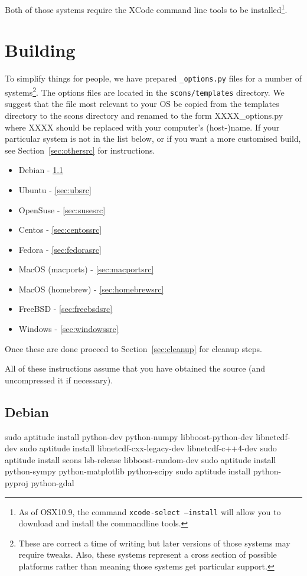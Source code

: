 \noindent Both of those systems require the XCode command line tools to be installed\footnote{As of OSX10.9, the 
command \texttt{xcode-select --install} will allow you to download and install the commandline tools.}.

\section{Building}\label{sec:build}

To simplify things for people, we have prepared \texttt{_options.py} files for a number of 
systems\footnote{These are correct a time of writing but later versions of those systems may require tweaks. 
Also, these systems represent a cross section of possible platforms rather than meaning those systems get particular support.}.
The options files are located in the \texttt{scons/templates} directory. We suggest that the file most relevant to your OS 
be copied from the templates directory to the scons directory and renamed to the form XXXX_options.py where XXXX 
should be replaced with your computer's (host-)name.
If your particular system is not in the list below, or if you want a more customised 
build, 
see Section~\ref{sec:othersrc} for instructions.
\begin{itemize}
 \item Debian - \ref{sec:debsrc}
 \item Ubuntu - \ref{sec:ubsrc}
 \item OpenSuse - \ref{sec:susesrc}
 \item Centos - \ref{sec:centossrc}
 \item Fedora - \ref{sec:fedorasrc}
 \item MacOS (macports) - \ref{sec:macportsrc}
 \item MacOS (homebrew) - \ref{sec:homebrewsrc}
 \item FreeBSD - \ref{sec:freebsdsrc}
 \item Windows - \ref{sec:windowssrc}
\end{itemize}

Once these are done proceed to Section~\ref{sec:cleanup} for cleanup steps.

All of these instructions assume that you have obtained the \escript source (and uncompressed it if necessary).
\subsection{Debian}\label{sec:debsrc}

\begin{shellCode}
sudo aptitude install python-dev python-numpy libboost-python-dev libnetcdf-dev 
sudo aptitude install libnetcdf-cxx-legacy-dev libnetcdf-c++4-dev
sudo aptitude install scons lsb-release libboost-random-dev
sudo aptitude install python-sympy python-matplotlib python-scipy
sudo aptitude install python-pyproj python-gdal 
\end{shellCode}

